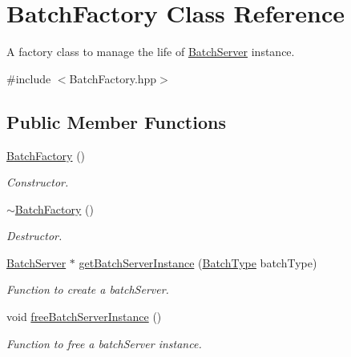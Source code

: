 \hypertarget{classBatchFactory}{
\section{BatchFactory Class Reference}
\label{classBatchFactory}
}


A factory class to manage the life of \hyperlink{classBatchServer}{BatchServer} instance.  




{\ttfamily \#include $<$BatchFactory.hpp$>$}

\subsection*{Public Member Functions}
\begin{DoxyCompactItemize}
\item 
\hypertarget{classBatchFactory_ad8bbb31a0cb233ed317ee0c9df83a659}{
\hyperlink{classBatchFactory_ad8bbb31a0cb233ed317ee0c9df83a659}{BatchFactory} ()}
\label{classBatchFactory_ad8bbb31a0cb233ed317ee0c9df83a659}

\begin{DoxyCompactList}\small\item\em Constructor. \item\end{DoxyCompactList}\item 
\hypertarget{classBatchFactory_a24536b638ac53cf338898fd183641e29}{
\hyperlink{classBatchFactory_a24536b638ac53cf338898fd183641e29}{$\sim$BatchFactory} ()}
\label{classBatchFactory_a24536b638ac53cf338898fd183641e29}

\begin{DoxyCompactList}\small\item\em Destructor. \item\end{DoxyCompactList}\item 
\hyperlink{classBatchServer}{BatchServer} $\ast$ \hyperlink{classBatchFactory_af328351dea45d4725ef1cdad782a1a22}{getBatchServerInstance} (\hyperlink{utilVishnu_8hpp_a864d748e7097d176552dd4c7635016ea}{BatchType} batchType)
\begin{DoxyCompactList}\small\item\em Function to create a batchServer. \item\end{DoxyCompactList}\item 
\hypertarget{classBatchFactory_a22ef8e4b5b902a4345be7a1d78f0c36f}{
void \hyperlink{classBatchFactory_a22ef8e4b5b902a4345be7a1d78f0c36f}{freeBatchServerInstance} ()}
\label{classBatchFactory_a22ef8e4b5b902a4345be7a1d78f0c36f}

\begin{DoxyCompactList}\small\item\em Function to free a batchServer instance. \item\end{DoxyCompactList}\end{DoxyCompactItemize}
